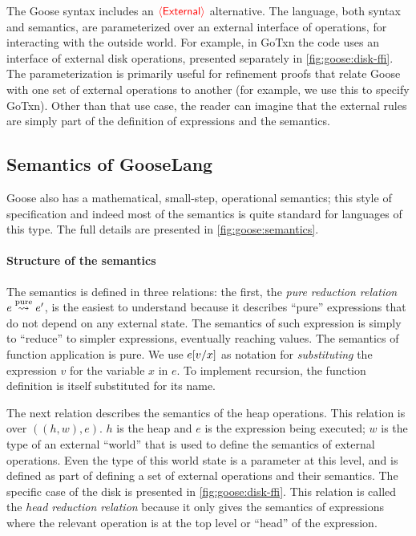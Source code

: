 
The Goose syntax includes an $\external$ alternative. The language, both syntax
and semantics, are parameterized over an external interface of operations, for
interacting with the outside world. For example, in GoTxn the code uses an
interface of external disk operations, presented separately in
\cref{fig:goose:disk-ffi}. The parameterization is primarily useful for
refinement proofs that relate Goose with one set of external operations to
another (for example, we use this to specify GoTxn). Other than that use case,
the reader can imagine that the external rules are simply part of the definition
of expressions and the semantics.

\subsection{Semantics of GooseLang}%
\label{sec:goose:semantics}

Goose also has a mathematical, small-step, operational semantics; this style of
specification and indeed most of the semantics is quite standard for languages of
this type. The full details are presented in \cref{fig:goose:semantics}.



\paragraph{Structure of the semantics}
The semantics is defined in three relations: the first, the
\emph{pure reduction relation} $e \purereduction e'$, is the easiest to understand
because it describes ``pure'' expressions that do not depend on any external
state. The semantics of such expression is simply to ``reduce'' to simpler
expressions, eventually reaching values. The semantics of function application
is pure. We use $\subst{e}{x}{v}$ as notation for \emph{substituting} the expression
$v$ for the variable $x$ in $e$. To implement recursion, the function definition
is itself substituted for its name.

The next relation describes the semantics of the heap operations. This relation is over
$((h, w), e)$. $h$ is the heap and $e$ is the expression being executed; $w$ is
the type of an external ``world'' that is used to define the semantics of
external operations. Even the type of this world state is a parameter at this
level, and is defined as part of defining a set of external operations and their
semantics. The specific case of the disk is presented in
\cref{fig:goose:disk-ffi}. This
relation is called the \emph{head reduction
relation} because it only gives the semantics of expressions where the
relevant operation is at the top level or ``head'' of the expression.

